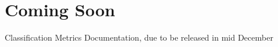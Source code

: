 \chapter{Coming Soon}\label{ch:future_work}

Classification Metrics Documentation, due to be released in mid December
